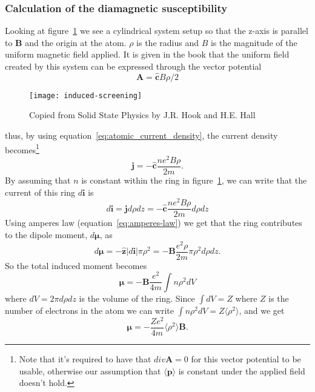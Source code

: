 \documentclass[11pt]{article}
\begin{document}
\subsubsection{Calculation of the diamagnetic susceptibility}
Looking at figure~\ref{fig:induced-screening} we see a cylindrical system setup so that the z-axis is parallel to $\pmb{B}$ and the origin at the atom.  $\rho$ is the radius and $B$ is the magnitude of the uniform magnetic field applied. It is given in the book that the uniform field created by this system can be expressed through the vector potential 
\begin{equation}
	\pmb{A} = \pmb{\hat{c}} B \rho/2
\end{equation}
\begin{figure}[!h]
	\centering
	\texttt{[image: induced-screening]}
	\caption{Copied from Solid State Physics by J.R. Hook and H.E. Hall}
	\label{fig:induced-screening}
\end{figure}
\newpage
thus, by using equation~\ref{eq:atomic_current_density}, the current density becomes\footnote{Note that it's required to have that $div \pmb{A} = 0$ for this vector potential to be usable, otherwise our assumption that $\langle \pmb{p} \rangle$ is constant under the applied field doesn't hold.}
\begin{equation}
	\pmb{j} =  - \pmb{\hat{c}} \frac{ne^2B\rho}{2m}.
\end{equation}
By assuming that $n$ is constant within the ring in figure~\ref{fig:induced-screening}, we can write that the current of this ring $d\pmb{i}$ is
\begin{equation}
	d\pmb{i} = \pmb{j} d\rho dz = - \pmb{\hat{c}} \frac{ne^2B\rho}{2m} d\rho dz
\end{equation}
Using amperes law (equation~\ref{eq:amperes-law}) we get that the ring contributes to the dipole moment, $d\pmb{\mu}$, as
\begin{equation}
	d\pmb{\mu} = - \pmb{\hat{z}} | d\pmb{i} | \pi \rho^2 = -\pmb{B} \frac{e^2\rho}{2m} \pi \rho^2 d\rho dz.
\end{equation}
So the total induced moment becomes
\begin{equation}
	\pmb{\mu} = - \pmb{B} \frac{e^2}{4m} \int n\rho^2 dV
\end{equation}
where $dV = 2\pi d\rho dz$ is the volume of the ring. Since $\int dV = Z$ where $Z$ is the number of electrons in the atom we can write $\int n\rho^2 dV = Z\langle \rho^2 \rangle$, and we get
\begin{equation}
	\pmb{\mu} = - \frac{Z e^2}{4m} \langle \rho^2 \rangle \pmb{B}.
	\label{eq:diamagnetic_dipole_moment}
\end{equation}
\end{document}
